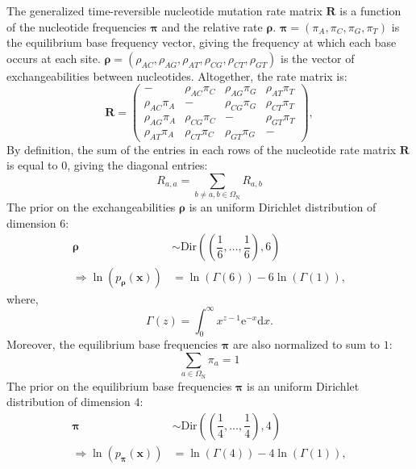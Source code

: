 \documentclass{article}
\newcommand{\e}{\mathrm{e}}
\newcommand{\der}{\mathrm{d}}
\newcommand{\SetNuc}{\Omega_{\mathrm{N}}}
\newcommand{\mutmatrix}{R}
\newcommand{\Mutmatrix}{\bm{\mutmatrix}}
\begin{document}
The generalized time-reversible nucleotide mutation rate matrix $\Mutmatrix$ is a function of the nucleotide frequencies $\bm{\pi}$ and the relative rate $\bm{\rho}$. $\bm{\pi} = (\pi_A , \pi_C , \pi_G , \pi_T)$ is the equilibrium base frequency vector, giving the frequency at which each base occurs at each site. $\bm{\rho} = \left( \rho_{AC}, \rho_{AG}, \rho_{AT}, \rho_{CG}, \rho_{CT}, \rho_{GT}\right)$ is the vector of exchangeabilities between nucleotides. Altogether, the rate matrix is:
\begin{equation}
\Mutmatrix = \begin{pmatrix}
- & {\rho_{AC} \pi_C} & {\rho_{AG}\pi_G} & {\rho_{AT}\pi_T} \\ 
{\rho_{AC}\pi_A} & - & {\rho_{CG}\pi_G} & {\rho_{CT}\pi_T} \\ 
{\rho_{AG}\pi_A} & {\rho_{CG}\pi_C} & - & {\rho_{GT}\pi_T} \\  
{\rho_{AT}\pi_A} & {\rho_{CT}\pi_C} & {\rho_{GT}\pi_G} & - 
\end{pmatrix},
\end{equation}
By definition, the sum of the entries in each rows of the nucleotide rate matrix $\Mutmatrix$ is equal to $0$, giving the diagonal entries:
\begin{equation}
\mutmatrix_{a,a} = \sum_{ b \neq a, b \in \SetNuc} \mutmatrix_{a,b}
\end{equation}
The prior on the exchangeabilities $\bm{\rho}$ is an uniform Dirichlet distribution of dimension $6$:
\begin{align}
\bm{\rho} & \sim \mathrm{Dir}\left( \left( \dfrac{1}{6}, \hdots , \dfrac{1}{6} \right) , 6\right) \\
\Rightarrow \ln \left(p_{\bm{\rho}}\left(\bm{x}\right)\right) & = \ln \left(\Gamma(6)\right) - 6\ln\left(\Gamma(1)\right), 
\end{align}
where, 
\begin{equation}
\Gamma(z) = \int_{0}^{\infty} x^{z-1} \e^{-x} \der x.
\end{equation}
Moreover, the equilibrium base frequencies $\bm{\pi}$ are also normalized to sum to $1$: 
\begin{equation}
\sum_{a \in \SetNuc} \pi_a  = 1
\end{equation}
The prior on the equilibrium base frequencies $\bm{\pi}$ is an uniform Dirichlet distribution of dimension $4$:
\begin{align}
\bm{\pi} & \sim \mathrm{Dir}\left( \left( \dfrac{1}{4}, \hdots , \dfrac{1}{4} \right) , 4\right) \\
\Rightarrow \ln \left(p_{\bm{\pi}}\left(\bm{x}\right)\right) & = \ln \left(\Gamma(4)\right) - 4\ln\left(\Gamma(1)\right), 
\end{align}
\end{document}
